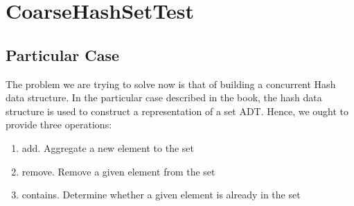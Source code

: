 \section{\textbf{CoarseHashSetTest}}
\subsection{Particular Case}
\par
The problem we are trying to solve now is that of building a concurrent Hash
data structure. In the particular case described in the book, the hash data
structure is used to construct a representation of a set ADT. Hence, we ought
to provide three operations:
\par
\begin{enumerate}
\item add. Aggregate a new element to the set
\item remove. Remove a given element from the set
\item contains. Determine whether a given element is already in the set
\end{enumerate}
\par
